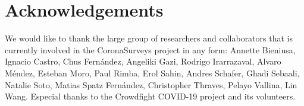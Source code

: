 \documentclass{article}
\begin{document}
\section{Acknowledgements}

We would like to thank the large group of researchers and collaborators that is currently involved in the CoronaSurveys project in any form: 
Annette Bieniusa,
Ignacio Castro, 
Chus Fernández,
Angeliki Gazi, 
Rodrigo Irarrazaval,
Alvaro Méndez,
Esteban Moro,
Paul Rimba,
Erol Sahin,
Andres Schafer,
Ghadi Sebaali,
Natalie Soto,
Matias Spatz Fernández,
Christopher Thraves, 
Pelayo Vallina, 
Lin Wang. Especial thanks to the Crowdfight COVID-19 project \cite{crowdfight} and its volunteers.






\end{document}
